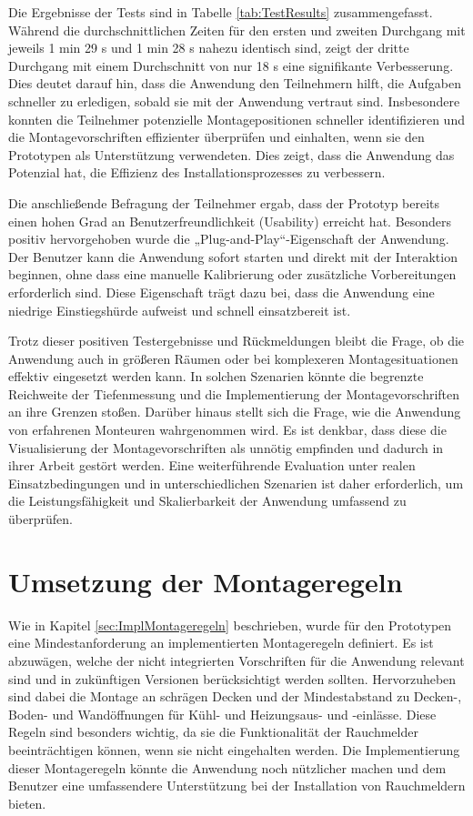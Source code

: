 Die Ergebnisse der Tests sind in Tabelle \ref{tab:TestResults} zusammengefasst. Während die durchschnittlichen Zeiten für den ersten und zweiten Durchgang mit jeweils 1 min 29 s und 1 min 28 s nahezu identisch sind, zeigt der dritte Durchgang mit einem Durchschnitt von nur 18 s eine signifikante Verbesserung. Dies deutet darauf hin, dass die Anwendung den Teilnehmern hilft, die Aufgaben schneller zu erledigen, sobald sie mit der Anwendung vertraut sind. Insbesondere konnten die Teilnehmer potenzielle Montagepositionen schneller identifizieren und die Montagevorschriften effizienter überprüfen und einhalten, wenn sie den Prototypen als Unterstützung verwendeten. Dies zeigt, dass die Anwendung das Potenzial hat, die Effizienz des Installationsprozesses zu verbessern.

Die anschließende Befragung der Teilnehmer ergab, dass der Prototyp bereits einen hohen Grad an Benutzerfreundlichkeit (Usability) erreicht hat. Besonders positiv hervorgehoben wurde die „Plug-and-Play“-Eigenschaft der Anwendung. Der Benutzer kann die Anwendung sofort starten und direkt mit der Interaktion beginnen, ohne dass eine manuelle Kalibrierung oder zusätzliche Vorbereitungen erforderlich sind. Diese Eigenschaft trägt dazu bei, dass die Anwendung eine niedrige Einstiegshürde aufweist und schnell einsatzbereit ist.

Trotz dieser positiven Testergebnisse und Rückmeldungen bleibt die Frage, ob die Anwendung auch in größeren Räumen oder bei komplexeren Montagesituationen effektiv eingesetzt werden kann. In solchen Szenarien könnte die begrenzte Reichweite der Tiefenmessung und die Implementierung der Montagevorschriften an ihre Grenzen stoßen. Darüber hinaus stellt sich die Frage, wie die Anwendung von erfahrenen Monteuren wahrgenommen wird. Es ist denkbar, dass diese die Visualisierung der Montagevorschriften als unnötig empfinden und dadurch in ihrer Arbeit gestört werden. Eine weiterführende Evaluation unter realen Einsatzbedingungen und in unterschiedlichen Szenarien ist daher erforderlich, um die Leistungsfähigkeit und Skalierbarkeit der Anwendung umfassend zu überprüfen.

\section{Umsetzung der Montageregeln}

Wie in Kapitel \ref{sec:ImplMontageregeln} beschrieben, wurde für den Prototypen eine Mindestanforderung an implementierten Montageregeln definiert. Es ist abzuwägen, welche der nicht integrierten Vorschriften für die Anwendung relevant sind und in zukünftigen Versionen berücksichtigt werden sollten. Hervorzuheben sind dabei die Montage an schrägen Decken und der Mindestabstand zu Decken-, Boden- und Wandöffnungen für Kühl- und Heizungsaus- und -einlässe. Diese Regeln sind besonders wichtig, da sie die Funktionalität der Rauchmelder beeinträchtigen können, wenn sie nicht eingehalten werden. Die Implementierung dieser Montageregeln könnte die Anwendung noch nützlicher machen und dem Benutzer eine umfassendere Unterstützung bei der Installation von Rauchmeldern bieten.

